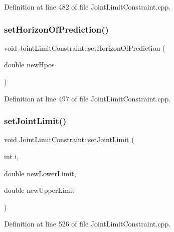Definition at line 482 of file Joint\+Limit\+Constraint.\+cpp.

\hypertarget{classocra_1_1JointLimitConstraint_a6903c0e8ea1024dd050b604e741634a6}{}\label{classocra_1_1JointLimitConstraint_a6903c0e8ea1024dd050b604e741634a6} 
\subsubsection{\texorpdfstring{set\+Horizon\+Of\+Prediction()}{setHorizonOfPrediction()}}
{\footnotesize\ttfamily void Joint\+Limit\+Constraint\+::set\+Horizon\+Of\+Prediction (\begin{DoxyParamCaption}\item[{double}]{new\+Hpos }\end{DoxyParamCaption})}



Definition at line 497 of file Joint\+Limit\+Constraint.\+cpp.

\hypertarget{classocra_1_1JointLimitConstraint_a774667152d3cd376ef3101a4db889c3f}{}\label{classocra_1_1JointLimitConstraint_a774667152d3cd376ef3101a4db889c3f} 
\subsubsection{\texorpdfstring{set\+Joint\+Limit()}{setJointLimit()}}
{\footnotesize\ttfamily void Joint\+Limit\+Constraint\+::set\+Joint\+Limit (\begin{DoxyParamCaption}\item[{int}]{i,  }\item[{double}]{new\+Lower\+Limit,  }\item[{double}]{new\+Upper\+Limit }\end{DoxyParamCaption})}



Definition at line 526 of file Joint\+Limit\+Constraint.\+cpp.

\hypertarget{classocra_1_1JointLimitConstraint_ab2dcfcc6420510ddc291dbae83e38c40}{}\label{classocra_1_1JointLimitConstraint_ab2dcfcc6420510ddc291dbae83e38c40} 
